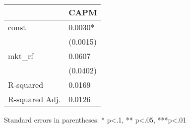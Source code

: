 \begin{table}
\caption{}
\label{}
\begin{center}
\begin{tabular}{ll}
\hline
               & CAPM      \\
\hline
const          & 0.0030*   \\
               & (0.0015)  \\
mkt\_rf        & 0.0607    \\
               & (0.0402)  \\
R-squared      & 0.0169    \\
R-squared Adj. & 0.0126    \\
\hline
\end{tabular}
\end{center}
\end{table}
\bigskip
Standard errors in parentheses. \newline 
* p<.1, ** p<.05, ***p<.01